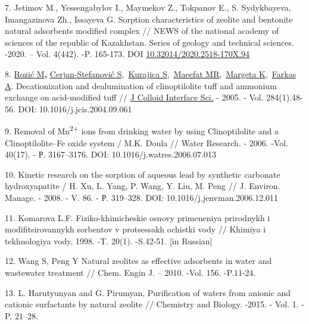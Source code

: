 7. Jetimov M., Yessengabylov I., Maymekov Z., Tokpanov E., S.
Sydykbayeva, Imangazinova Zh., Issayeva G. Sorption characteristics of
zeolite and bentonite natural adsorbents modified complex // NEWS of the
national academy of sciences of the republic of Kazakhstan. Series of
geology and technical sciences. -2020. -- Vol. 4(442). -P. 165-173. DOI
\href{http://dx.doi.org/10.32014/2020.2518-170X.94}{10.32014/2020.2518-170X.94}

8.
\href{https://www.ncbi.nlm.nih.gov/pubmed/?term=Rozi\%C4\%87\%20M\%5BAuthor\%5D&cauthor=true&cauthor_uid=15752783}{Rozić
M}{\bfseries ,}
\href{https://www.ncbi.nlm.nih.gov/pubmed/?term=Cerjan-Stefanovi\%C4\%87\%20S\%5BAuthor\%5D&cauthor=true&cauthor_uid=15752783}{Cerjan-Stefanović
S},~\href{https://www.ncbi.nlm.nih.gov/pubmed/?term=Kurajica\%20S\%5BAuthor\%5D&cauthor=true&cauthor_uid=15752783}{Kurajica
S},~\href{https://www.ncbi.nlm.nih.gov/pubmed/?term=Maeefat\%20MR\%5BAuthor\%5D&cauthor=true&cauthor_uid=15752783}{Maeefat
MR},~\href{https://www.ncbi.nlm.nih.gov/pubmed/?term=Margeta\%20K\%5BAuthor\%5D&cauthor=true&cauthor_uid=15752783}{Margeta
K},~\href{https://www.ncbi.nlm.nih.gov/pubmed/?term=Farkas\%20A\%5BAuthor\%5D&cauthor=true&cauthor_uid=15752783}{Farkas
A}. Decationization and dealumination of clinoptilolite tuff and
ammonium exchange on acid-modified tuff //
\href{https://www.ncbi.nlm.nih.gov/pubmed/15752783}{J Colloid Interface
Sci.} - 2005. - Vol. 284(1).48-56. DOI: 10.1016/j.jcis.2004.09.061

9. Removal of Mn\textsuperscript{2+} ions from drinking water by using
Clinoptilolite and a Clinoptilolite--Fe oxide system / M.K. Doula //
Water Research. - 2006. -Vol. 40(17). - Р. 3167--3176. DOI:
10.1016/j.watres.2006.07.013

10. Kinetic research on the sorption of aqueous lead by synthetic
carbonate hydroxyapatite / H. Xu, L. Yang, P. Wang, Y. Liu, M. Peng //
J. Environ. Manage. - 2008. - V. 86. - Р. 319--328. DOI:
10.1016/j.jenvman.2006.12.011

11. Komarova L.F. Fiziko-khimicheskie osnovy primeneniya prirodnykh i
modifitsirovannykh sorbentov v protsessakh ochistki vody // Khimiya i
tekhnologiya vody, 1998. -T. 20(1). -S.42-51. {[}in Russian{]}

12. Wang S, Peng Y Natural zeolites as effective adsorbents in water and
wastewater treatment // Chem. Engin J. -- 2010. -Vol. 156. -P.11-24.

13. L. Harutyunyan and G. Pirumyan, Purification of waters from anionic
and cationic surfactants by natural zeolite // Chemistry and Biology.
-2015. - Vol. 1. - P. 21--28.

